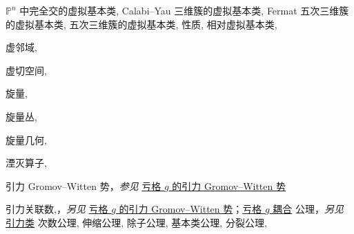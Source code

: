 \begin{theindex}
\subsubitem \leavevmode\hypertarget{idx:1420}{$\mathbb P^n$ 中完全交的虚拟基本类},\enspace{}
\subitem \leavevmode\hypertarget{idx:1421}{Calabi--Yau 三维簇的虚拟基本类},\enspace{}
\subitem \leavevmode\hypertarget{idx:1422}{Fermat 五次三维簇的虚拟基本类},\enspace{}
\subitem \leavevmode\hypertarget{idx:1423}{五次三维簇的虚拟基本类},\enspace{}
\subitem \leavevmode\hypertarget{idx:1424}{性质},\enspace{}
\subitem \leavevmode\hypertarget{idx:1425}{相对虚拟基本类},\enspace{}
\indexspace
\item \leavevmode\hypertarget{idx:1426}{虚邻域},\enspace{}
\indexspace
\item \leavevmode\hypertarget{idx:1429}{虚切空间},\enspace{}
\indexspace
\item \leavevmode\hypertarget{idx:1268}{旋量},\enspace{}
\indexspace
\item \leavevmode\hypertarget{idx:1266}{旋量丛},\enspace{}
\indexspace
\item \leavevmode\hypertarget{idx:1267}{旋量几何},\enspace{}
\indexspace
\item \leavevmode\hypertarget{idx:0049}{湮灭算子},\enspace{}
\indexspace
\item \leavevmode\hypertarget{idx:0479}{引力 Gromov--Witten 势}，\textit{参见} \hyperlink{idx:0376}{亏格 $g$ 的引力 Gromov--Witten 势}
\indexspace
\item \leavevmode\hypertarget{idx:0459}{引力关联数},\enspace{}，\textit{另见} \hyperlink{idx:0376}{亏格 $g$ 的引力 Gromov--Witten 势}；\hyperlink{idx:0375}{亏格 $g$ 耦合}
\subitem \leavevmode\hypertarget{idx:0460}{公理}，\textit{另见} \hyperlink{idx:0457}{引力类}
\subsubitem \leavevmode\hypertarget{idx:0461}{次数公理},\enspace{}
\subsubitem \leavevmode\hypertarget{idx:0462}{伸缩公理},\enspace{}
\subsubitem \leavevmode\hypertarget{idx:0463}{除子公理},\enspace{}
\subsubitem \leavevmode\hypertarget{idx:0464}{基本类公理},\enspace{}
\subsubitem \leavevmode\hypertarget{idx:0465}{分裂公理},\enspace{}

\end{theindex}
